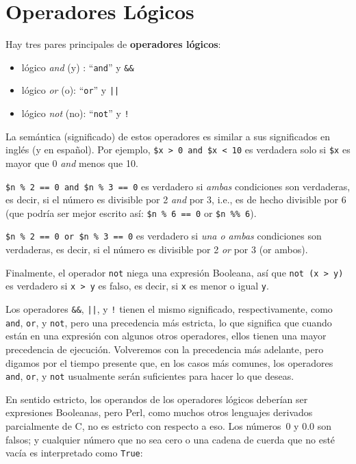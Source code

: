 \section{Operadores Lógicos}

Hay tres pares principales de {\bf operadores lógicos}:
\begin{itemize}
\item lógico \emph{and} (y) : ``{\tt and}'' y {\tt \&\&}
\item lógico \emph{or} (o): ``{\tt or}'' y {\tt ||}
\item lógico \emph{not} (no): ``{\tt not}'' y {\tt !}
\end{itemize}

La semántica (significado) de estos operadores es similar
a sus significados en inglés (y en español). Por ejemplo,
{\tt \$x > 0 and \$x < 10} es verdadera solo si {\tt \$x}
es mayor que 0 \emph{and} menos que 10.

{\tt \$n \% 2 == 0 and \$n \% 3 == 0} es verdadero si {\em ambas}
condiciones son verdaderas, es decir, si el número es divisible por
2 \emph{and} por 3, i.e., es de hecho divisible por 6 (que podría
ser mejor escrito así: {\tt \$n \% 6 == 0} or {\tt \$n \%\% 6}).

{\tt \$n \% 2 == 0 or \$n \% 3 == 0} es verdadero si \emph{una o ambas}
condiciones son verdaderas, es decir, si el número es divisible por 2
\emph{or} por 3 (or ambos).

Finalmente, el operador {\tt not} niega una expresión Booleana,
así que {\tt not (x > y)} es verdadero si {\tt x > y} es falso, es
decir, si {\tt x} es menor o igual {\tt y}.

Los operadores {\tt \&\&}, {\tt ||}, y {\tt !} tienen el mismo
significado, respectivamente, como {\tt and}, {\tt or}, y {\tt not},
pero una precedencia más estricta, lo que significa 
que cuando están en una expresión con algunos otros operadores,
ellos tienen una mayor precedencia de ejecución. Volveremos
con la precedencia más adelante, pero digamos por el tiempo
presente que, en los casos más comunes, los operadores 
{\tt and}, {\tt or}, y {\tt not} usualmente serán suficientes
para hacer lo que deseas.

En sentido estricto, los operandos de los operadores lógicos
deberían ser expresiones Booleanas, pero Perl, como muchos
otros lenguajes derivados parcialmente de C, no es estricto
con respecto a eso. Los números~0 y 0.0 son falsos; y cualquier
número que no sea cero o una cadena de cuerda que no esté 
vacía es interpretado como {\tt True}:

